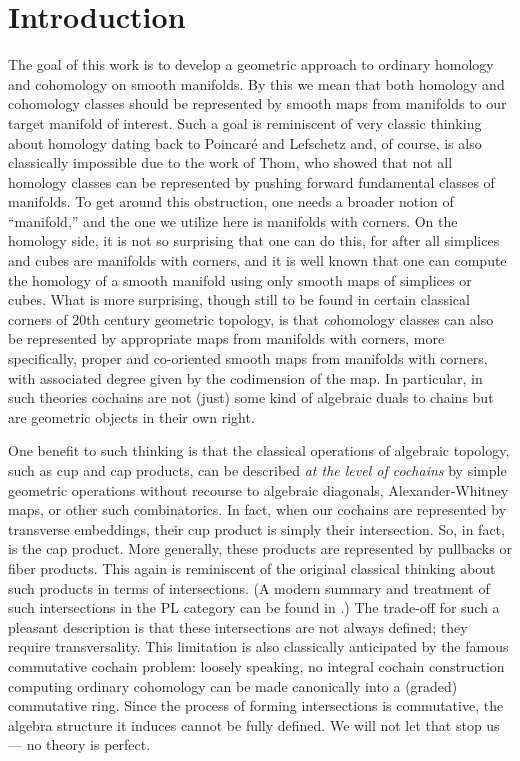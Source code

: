 
\section{Introduction}\label{intro}

The goal of this work is to develop a geometric approach to ordinary homology and cohomology on smooth manifolds.
By this we mean that both homology and cohomology classes should be represented by smooth maps from manifolds to our target manifold of interest.
Such a goal is reminiscent of very classic thinking about homology dating back to Poincar\'e and Lefschetz and, of course, is also classically impossible due to the work of Thom, who showed that not all homology classes can be represented by pushing forward fundamental classes of manifolds.
To get around this obstruction, one needs a broader notion of ``manifold,'' and the one we utilize here is manifolds with corners.
On the homology side, it is not so surprising that one can do this, for after all simplices and cubes are manifolds with corners, and it is well known that one can compute the homology of a smooth manifold using only smooth maps of simplices or cubes.
What is more surprising, though still to be found in certain classical corners of 20th century geometric topology, is that \textit{co}homology classes can also be represented by appropriate maps from manifolds with corners, more specifically, proper and co-oriented smooth maps from manifolds with corners, with associated degree given by the codimension of the map.
In particular, in such theories cochains are not (just) some kind of algebraic duals to chains but are geometric objects in their own right.

One benefit to such thinking is that the classical operations of algebraic topology, such as cup and cap products, can be described \textit{at the level of cochains} by simple geometric operations without recourse to algebraic diagonals, Alexander-Whitney maps, or other such combinatorics.
In fact, when our cochains are represented by transverse embeddings, their cup product is simply their intersection.
So, in fact, is the cap product.
More generally, these products are represented by pullbacks or fiber products.
This again is reminiscent of the original classical thinking about such products in terms of intersections.
(A modern summary and treatment of such intersections in the PL category can be found in \cite{McC06}.)
The trade-off for such a pleasant description is that these intersections are not always defined; they require transversality.
This limitation is also classically anticipated by the famous commutative cochain problem: loosely speaking, no integral cochain construction computing ordinary cohomology can be made canonically into a (graded) commutative ring.
Since the process of forming intersections is commutative, the algebra structure it induces cannot be fully defined.
We will not let that stop us --- no theory is perfect.

